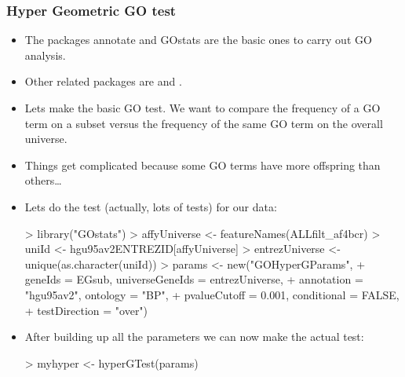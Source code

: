 \begin{frame}
  \frametitle{Hyper Geometric GO test}
  \begin{itemize}
  \item The packages \alert{annotate} and \alert{GOstats} are the basic ones to carry out GO analysis.
  \item Other related packages are  and .
  \item Lets make the basic GO test. We want to compare the frequency of a GO term on a subset versus the frequency of the same GO term on the overall universe.
  \item Things get complicated because some GO terms have more offspring than others\ldots
  \item Lets do the test (actually, lots of tests) for our data:
\begin{Schunk}
\begin{Sinput}
> library("GOstats")
> affyUniverse <- featureNames(ALLfilt_af4bcr)
> uniId <- hgu95av2ENTREZID[affyUniverse]
> entrezUniverse <- unique(as.character(uniId))
> params <- new("GOHyperGParams", 
+     geneIds = EGsub, universeGeneIds = entrezUniverse, 
+     annotation = "hgu95av2", ontology = "BP", 
+     pvalueCutoff = 0.001, conditional = FALSE, 
+     testDirection = "over")
\end{Sinput}
\end{Schunk}
  \item After building up all the parameters we can now make the actual test:
\begin{Schunk}
\begin{Sinput}
> myhyper <- hyperGTest(params)
\end{Sinput}
\end{Schunk}
  \end{itemize}
\end{frame}

